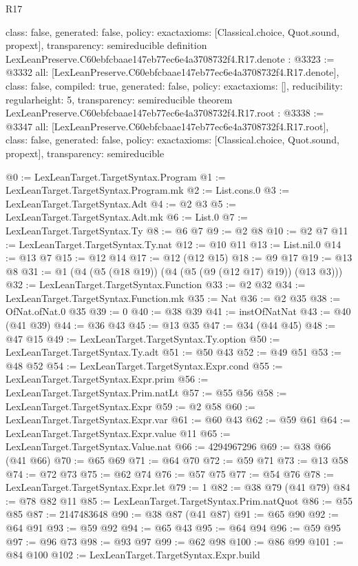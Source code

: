 \begin{lexlean}{R17}
\begin{coremodule}
{  class: false,
  generated: false,
  policy: exact{axioms: [Classical.choice, Quot.sound, propext]},
  transparency: semireducible
}
definition LexLeanPreserve.C60ebfcbaae147eb77ec6e4a3708732f4.R17.denote : @3323 := @3332 {
  all: [LexLeanPreserve.C60ebfcbaae147eb77ec6e4a3708732f4.R17.denote],
  class: false,
  compiled: true,
  generated: false,
  policy: exact{axioms: []},
  reducibility: regular{height: 5},
  transparency: semireducible
}
theorem LexLeanPreserve.C60ebfcbaae147eb77ec6e4a3708732f4.R17.root : @3338 := @3347 {
  all: [LexLeanPreserve.C60ebfcbaae147eb77ec6e4a3708732f4.R17.root],
  class: false,
  generated: false,
  policy: exact{axioms: [Classical.choice, Quot.sound, propext]},
  transparency: semireducible
}

@0 := LexLeanTarget.TargetSyntax.Program
@1 := LexLeanTarget.TargetSyntax.Program.mk
@2 := List.cons.{0}
@3 := LexLeanTarget.TargetSyntax.Adt
@4 := @2 @3
@5 := LexLeanTarget.TargetSyntax.Adt.mk
@6 := List.{0}
@7 := LexLeanTarget.TargetSyntax.Ty
@8 := @6 @7
@9 := @2 @8
@10 := @2 @7
@11 := LexLeanTarget.TargetSyntax.Ty.nat
@12 := @10 @11
@13 := List.nil.{0}
@14 := @13 @7
@15 := @12 @14
@17 := @12 (@12 @15)
@18 := @9 @17
@19 := @13 @8
@31 := @1 (@4 (@5 (@18 @19)) (@4 (@5 (@9 (@12 @17) @19)) (@13 @3)))
@32 := LexLeanTarget.TargetSyntax.Function
@33 := @2 @32
@34 := LexLeanTarget.TargetSyntax.Function.mk
@35 := Nat
@36 := @2 @35
@38 := OfNat.ofNat.{0} @35
@39 := 0
@40 := @38 @39
@41 := instOfNatNat
@43 := @40 (@41 @39)
@44 := @36 @43
@45 := @13 @35
@47 := @34 (@44 @45)
@48 := @47 @15
@49 := LexLeanTarget.TargetSyntax.Ty.option
@50 := LexLeanTarget.TargetSyntax.Ty.adt
@51 := @50 @43
@52 := @49 @51
@53 := @48 @52
@54 := LexLeanTarget.TargetSyntax.Expr.cond
@55 := LexLeanTarget.TargetSyntax.Expr.prim
@56 := LexLeanTarget.TargetSyntax.Prim.natLt
@57 := @55 @56
@58 := LexLeanTarget.TargetSyntax.Expr
@59 := @2 @58
@60 := LexLeanTarget.TargetSyntax.Expr.var
@61 := @60 @43
@62 := @59 @61
@64 := LexLeanTarget.TargetSyntax.Expr.value @11
@65 := LexLeanTarget.TargetSyntax.Value.nat
@66 := 4294967296
@69 := @38 @66 (@41 @66)
@70 := @65 @69
@71 := @64 @70
@72 := @59 @71
@73 := @13 @58
@74 := @72 @73
@75 := @62 @74
@76 := @57 @75
@77 := @54 @76
@78 := LexLeanTarget.TargetSyntax.Expr.let
@79 := 1
@82 := @38 @79 (@41 @79)
@84 := @78 @82 @11
@85 := LexLeanTarget.TargetSyntax.Prim.natQuot
@86 := @55 @85
@87 := 2147483648
@90 := @38 @87 (@41 @87)
@91 := @65 @90
@92 := @64 @91
@93 := @59 @92
@94 := @65 @43
@95 := @64 @94
@96 := @59 @95
@97 := @96 @73
@98 := @93 @97
@99 := @62 @98
@100 := @86 @99
@101 := @84 @100
@102 := LexLeanTarget.TargetSyntax.Expr.build

\end{coremodule}
\end{lexlean}
